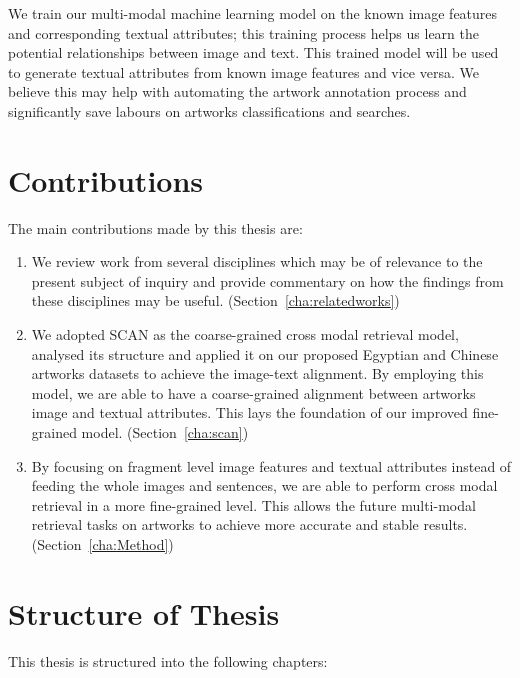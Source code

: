 We train our multi-modal machine learning model on the known image features and corresponding textual attributes; this training process helps us learn the potential relationships between image and text. This trained model will be used to generate textual attributes from known image features and vice versa. We believe this may help with automating the artwork annotation process and significantly save labours on artworks classifications and searches.


\section{Contributions}
The main contributions made by this thesis are:

\begin{enumerate}
    \item We review work from several disciplines which may be of relevance to the present subject of inquiry and provide commentary on how the findings from these disciplines may be useful. (Section~\ref{cha:relatedworks})
    \item We adopted SCAN \cite{scan} as the coarse-grained cross modal retrieval model, analysed its structure and applied it on our proposed Egyptian and Chinese artworks datasets to achieve the image-text alignment. By employing this model, we are able to have a coarse-grained alignment between artworks image and textual attributes. This lays the foundation of our improved fine-grained model. (Section~\ref{cha:scan})
    \item By focusing on fragment level image features and textual attributes instead of feeding the whole images and sentences, we are able to perform cross modal retrieval in a more fine-grained level. This allows the future multi-modal retrieval tasks on artworks to achieve more accurate and stable results. (Section~\ref{cha:Method})
\end{enumerate}


\section{Structure of Thesis}

This thesis is structured into the following chapters:

